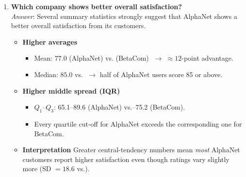 \documentclass[12pt]{article}
\begin{document}
\begin{enumerate}[label=2.\arabic*]
\item \textbf{Which company shows better overall satisfaction?}\\[2pt]
\emph{Answer}:  Several summary statistics strongly suggest that AlphaNet shows a better overall satisfaction from its customers.
\begin{itemize}
    \item \textbf{Higher averages}
        \begin{itemize}
            \item Mean: \(\mathbf{77.0}\) (AlphaNet) vs. (BetaCom) \(\;\to\) \(\approx\!\!12\)-point advantage.
            \item Median: \(\mathbf{85.0}\) vs. \(\;\to\) half of AlphaNet users score 85 or above.
        \end{itemize}
    \item \textbf{Higher middle spread (IQR)}
        \begin{itemize}
            \item \(Q_1\)–\(Q_3\): 65.1–89.6 (AlphaNet) vs.–75.2 (BetaCom).
            \item Every quartile cut-off for AlphaNet exceeds the corresponding one for BetaCom.
        \end{itemize}
    \item \textbf{Interpretation}
        Greater central-tendency numbers mean \emph{most} AlphaNet customers report higher satisfaction even though ratings vary slightly more (SD \(=18.6\) vs.).
\end{itemize}


\end{enumerate}
\end{document}
